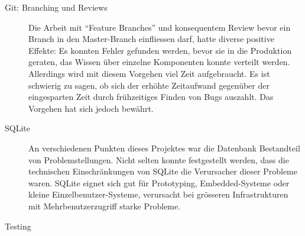 \begin{description}
	\item[Git: Branching und Reviews] Die Arbeit mit \enquote{Feature Branches} und
	konsequentem Review bevor ein Branch in den Master-Branch einfliessen darf,
	hatte diverse positive Effekte: Es konnten Fehler gefunden werden, bevor sie in
	die Produktion geraten, das Wissen über einzelne Komponenten konnte verteilt
	werden. Allerdings wird mit diesem Vorgehen viel Zeit aufgebraucht. Es ist schwierig
	zu sagen, ob sich der erhöhte Zeitaufwand gegenüber der eingesparten Zeit
	durch frühzeitiges Finden von Bugs auszahlt. Das Vorgehen hat sich jedoch
	bewährt.
	
	\item[SQLite] An verschiedenen Punkten dieses Projektes war die Datenbank
	Bestandteil von Problemstellungen. Nicht selten konnte festgestellt werden,
	dass die technischen Einschränkungen von SQLite die Verursacher dieser Probleme
	waren. SQLite eignet sich gut für Prototyping, Embedded-Systeme oder kleine
	Einzelbenutzer-Systeme, verursacht bei grösseren Infrastrukturen mit
	Mehrbenutzerzugriff starke Probleme.
	
	\item[Testing] 
	
\end{description}


